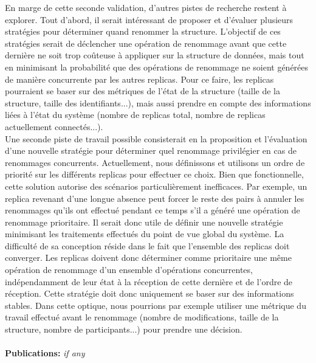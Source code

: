 \documentclass[12pt]{article}
\newcommand{\commentaire}[1]{\small\textit{#1}}
\begin{document}
En marge de cette seconde validation, d'autres pistes de recherche restent à explorer.
Tout d'abord, il serait intéressant de proposer et d'évaluer plusieurs stratégies pour déterminer quand renommer la structure.
L'objectif de ces stratégies serait de déclencher une opération de renommage avant que cette dernière ne soit trop coûteuse à appliquer sur la structure de données, mais tout en minimisant la probabilité que des opérations de renommage ne soient générées de manière concurrente par les autres replicas.
Pour ce faire, les replicas pourraient se baser sur des métriques de l'état de la structure (taille de la structure, taille des identifiants...), mais aussi prendre en compte des informations liées à l'état du système (nombre de replicas total, nombre de replicas actuellement connectés...).
\\

Une seconde piste de travail possible consisterait en la proposition et l'évaluation d'une nouvelle stratégie pour déterminer quel renommage privilégier en cas de renommages concurrents.
Actuellement, nous définissons et utilisons un ordre de priorité sur les différents replicas pour effectuer ce choix.
Bien que fonctionnelle, cette solution autorise des scénarios particulièrement inefficaces.
Par exemple, un replica revenant d'une longue absence peut forcer le reste des pairs à annuler les renommages qu'ils ont effectué pendant ce temps s'il a généré une opération de renommage prioritaire.
Il serait donc utile de définir une nouvelle stratégie minimisant les traitements effectués du point de vue global du système.
La difficulté de sa conception réside dans le fait que l'ensemble des replicas doit converger.
Les replicas doivent donc déterminer comme prioritaire une même opération de renommage d'un ensemble d'opérations concurrentes, indépendamment de leur état à la réception de cette dernière et de l'ordre de réception.
Cette stratégie doit donc uniquement se baser sur des informations stables.
Dans cette optique, nous pourrions par exemple utiliser une métrique du travail effectué avant le renommage (nombre de modifications, taille de la structure, nombre de participants...) pour prendre une décision.
\\

\\

\noindent\textbf{Publications:}
\commentaire{%
  if any\\}


\nocite{*}
\end{document}
